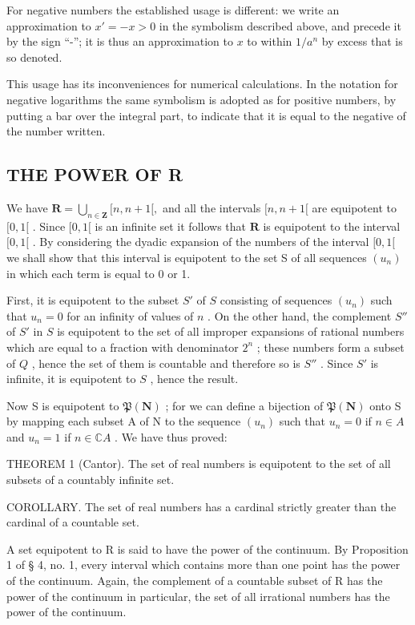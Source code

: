 For negative numbers the established usage is different: we write an approximation to \(x' = -x > 0\) in the symbolism described above, and precede it by the sign ``-''; it is thus an approximation to \(x\) to within \(1/a^n\) by excess that is so denoted.

This usage has its inconveniences for numerical calculations. In the notation for negative logarithms the same symbolism is adopted as for positive numbers, by putting a bar over the integral part, to indicate that it is equal to the negative of the number written.

\subsection{THE POWER OF R}

We have \(\mathbf{R} = \bigcup_{n\in \mathbf{Z}}[n,n + 1[,\) and all the intervals \([n,n + 1[\) are equipotent to \([0,1[\) . Since \([0,1[\) is an infinite set it follows that \(\mathbf{R}\) is equipotent to the interval \([0,1[\) . By considering the dyadic expansion of the numbers of the interval \([0,1[\) we shall show that this interval is equipotent to the set S of all sequences \((u_n)\) in which each term is equal to 0 or 1.

First, it is equipotent to the subset \(S'\) of \(S\) consisting of sequences \((u_n)\) such that \(u_n = 0\) for an infinity of values of \(n\) . On the other hand, the complement \(S''\) of \(S'\) in \(S\) is equipotent to the set of all improper expansions of rational numbers which are equal to a fraction with denominator \(2^n\) ; these numbers form a subset of \(Q\) , hence the set of them is countable and therefore so is \(S''\) . Since \(S'\) is infinite, it is equipotent to \(S\) , hence the result.

Now S is equipotent to \(\mathfrak{P}(\mathbf{N})\) ; for we can define a bijection of \(\mathfrak{P}(\mathbf{N})\) onto S by mapping each subset A of N to the sequence \((u_n)\) such that \(u_n = 0\) if \(n \in A\) and \(u_n = 1\) if \(n \in \mathbb{C}A\) . We have thus proved:

THEOREM 1 (Cantor). The set of real numbers is equipotent to the set of all subsets of a countably infinite set.

COROLLARY. The set of real numbers has a cardinal strictly greater than the cardinal of a countable set.

A set equipotent to R is said to have the power of the continuum. By Proposition 1 of § 4, no. 1, every interval which contains more than one point has the power of the continuum. Again, the complement of a countable subset of R has the power of the continuum in particular, the set of all irrational numbers has the power of the continuum.

